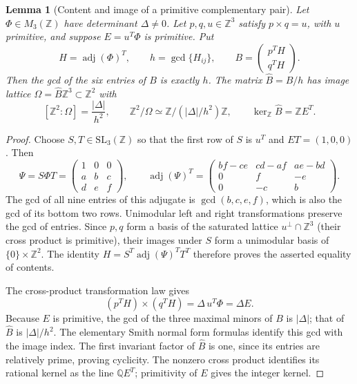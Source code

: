 \documentclass[11pt,a4paper]{article}
\newtheorem{lemma}[theorem]{Lemma}
\theoremstyle{definition}
\theoremstyle{remark}
\numberwithin{equation}{section}
\begin{document}
\begin{lemma}[Content and image of a primitive complementary pair]
\label{p5:lem:cmf-content}
Let $\Phi\in M_3(\mathbb Z)$ have determinant $\Delta\ne0$.
Let $p,q,u\in\mathbb Z^3$ satisfy $p\times q=u$, with $u$ primitive,
and suppose $E=u^T\Phi$ is primitive. Put
\[
 H=\operatorname{adj}(\Phi)^T,\qquad
 h=\gcd\{H_{ij}\},\qquad
 B=\begin{pmatrix}p^TH\\q^TH\end{pmatrix}.
\]
Then the gcd of the six entries of $B$ is exactly $h$.
The matrix $\widehat B=B/h$ has image lattice
$\Omega=\widehat B\mathbb Z^3\subset\mathbb Z^2$ with
\begin{equation}\label{p5:eq:cmf-image-index}
 [\mathbb Z^2:\Omega]=\frac{|\Delta|}{h^2},\qquad
 \mathbb Z^2/\Omega\simeq\mathbb Z/(|\Delta|/h^2)\mathbb Z,
 \qquad \ker_{\mathbb Z}\widehat B=\mathbb Z E^T.
\end{equation}
\end{lemma}
\begin{proof}
Choose $S,T\in\mathrm{SL}_3(\mathbb Z)$ so that the first row of $S$
is $u^T$ and $ET=(1,0,0)$. Then
\[
 \Psi=S\Phi T=\begin{pmatrix}1&0&0\\a&b&c\\d&e&f\end{pmatrix},
 \qquad
 \operatorname{adj}(\Psi)^T=
 \begin{pmatrix}bf-ce&cd-af&ae-bd\\0&f&-e\\0&-c&b\end{pmatrix}.
\]
The gcd of all nine entries of this adjugate is
$\gcd(b,c,e,f)$, which is also the gcd of its bottom two rows.
Unimodular left and right transformations preserve the gcd of entries.
Since $p,q$ form a basis of the saturated lattice $u^\perp\cap\mathbb Z^3$
(their cross product is primitive), their images under $S$ form a
unimodular basis of $\{0\}\times\mathbb Z^2$.
The identity
$H=S^T\operatorname{adj}(\Psi)^T T^T$ therefore proves the asserted
equality of contents.

The cross-product transformation law gives
\[
 (p^TH)\times(q^TH)=\Delta\,u^T\Phi=\Delta E.
\]
Because $E$ is primitive, the gcd of the three maximal minors of
$B$ is $|\Delta|$; that of $\widehat B$ is $|\Delta|/h^2$.
The elementary Smith normal form formulas identify this gcd with the
image index. The first invariant factor of $\widehat B$ is one,
since its entries are relatively prime, proving cyclicity. The
nonzero cross product identifies its rational kernel as the line
$\mathbb QE^T$; primitivity of $E$ gives the integer kernel.
\end{proof}
\end{document}
